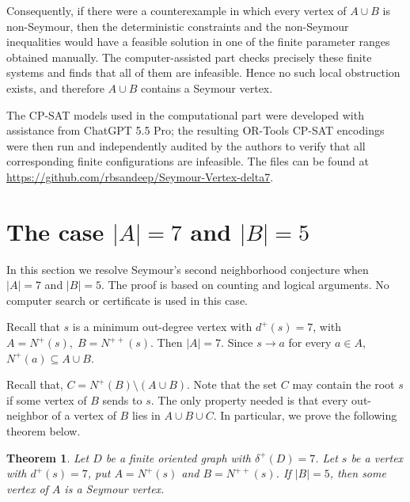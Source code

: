 \documentclass[a4paper,fleqn]{cas-sc}
\newtheorem{theorem}{Theorem}[section]
\theoremstyle{definition}
\begin{document}
Consequently, if there were a counterexample in which every vertex of \(A\cup B\) is non-Seymour, then the deterministic constraints and the non-Seymour inequalities would have a feasible solution in one of the finite parameter ranges obtained manually. The computer-assisted part checks precisely these finite systems and finds that all of them are infeasible. Hence no such local obstruction exists, and therefore \(A\cup B\) contains a Seymour vertex.

The CP-SAT models used in the computational part were developed with assistance from ChatGPT 5.5 Pro; the resulting OR-Tools CP-SAT encodings were then run and independently audited by the authors to verify that all corresponding finite configurations are infeasible. The files can be found at \url{https://github.com/rbsandeep/Seymour-Vertex-delta7}.







\section{The case  $|A|=7$ and $|B|=5$}

In this section we resolve Seymour’s second neighborhood conjecture when $|A|=7$ and $|B|=5$. The proof is based on counting and logical arguments. No computer search or certificate is used in this case. 

Recall that $s$ is a minimum out-degree vertex with $d^+(s)=7$, with $A=N^+(s),\; B=N^{++}(s)$. Then $|A|=7$. Since $s\to a$ for every $a\in A$, $N^+(a)\subseteq A\cup B$.



Recall that, $C=N^+(B)\setminus (A\cup B).$
Note that the set $C$ may contain the root $s$ if some vertex of $B$ sends to $s$. The only property needed is that every out-neighbor of a vertex of $B$ lies in $A\cup B\cup C$.
In particular, we prove the following theorem below.

\begin{theorem}
Let $D$ be a finite oriented graph with $\delta^+(D)=7$. Let $s$ be a vertex with $d^+(s)=7$, put $A=N^+(s)$ and $B=N^{++}(s)$. If $|B|=5$, then some vertex of $A$ is a Seymour vertex.
\end{theorem}
\end{document}
